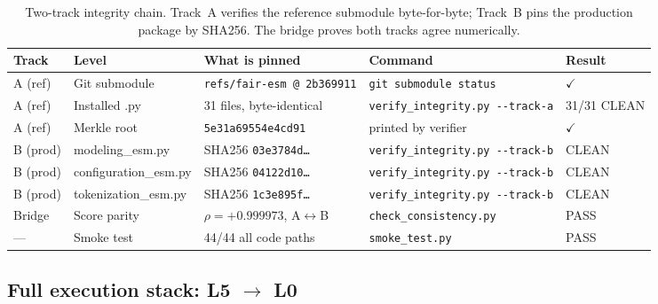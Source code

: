 \documentclass[11pt,a4paper]{article}
\begin{document}
\begin{table}[ht]
\centering
\caption{%
  Two-track integrity chain. Track~A verifies the reference submodule
  byte-for-byte; Track~B pins the production package by SHA256.
  The bridge proves both tracks agree numerically.
}
\label{tab:integrity}
\begin{tabular}{lllll}
\toprule
Track & Level & What is pinned & Command & Result \\
\midrule
A (ref) & Git submodule & \texttt{refs/fair-esm @ 2b369911} &
  \lstinline|git submodule status| & $\checkmark$ \\
A (ref) & Installed .py & 31 files, byte-identical &
  \lstinline|verify_integrity.py --track-a| & 31/31 CLEAN \\
A (ref) & Merkle root & \texttt{5e31a69554e4cd91} &
  printed by verifier & $\checkmark$ \\
\midrule
B (prod) & modeling\_esm.py & SHA256 \texttt{03e3784d\ldots} &
  \lstinline|verify_integrity.py --track-b| & CLEAN \\
B (prod) & configuration\_esm.py & SHA256 \texttt{04122d10\ldots} &
  \lstinline|verify_integrity.py --track-b| & CLEAN \\
B (prod) & tokenization\_esm.py & SHA256 \texttt{1c3e895f\ldots} &
  \lstinline|verify_integrity.py --track-b| & CLEAN \\
\midrule
Bridge & Score parity & $\rho = +0.999973$, A$\leftrightarrow$B &
  \lstinline|check_consistency.py| & PASS \\
— & Smoke test & 44/44 all code paths &
  \lstinline|smoke_test.py| & PASS \\
\bottomrule
\end{tabular}
\end{table}

\subsection{Full execution stack: L5 \texorpdfstring{$\to$}{to} L0}
\end{document}
